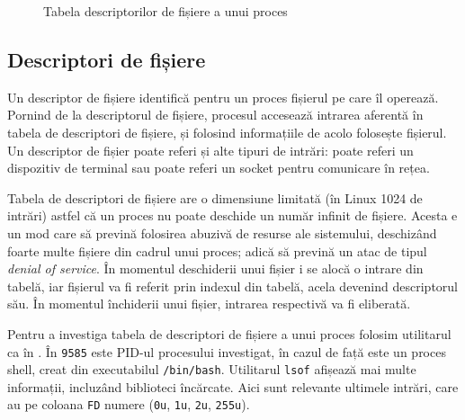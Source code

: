 \begin{figure}[!htbp]
  \centering
  \def\svgwidth{0.8\textwidth}
  
  \caption{Tabela descriptorilor de fișiere a unui proces}
  \label{fig:process:fdtab}
\end{figure}

\subsection{Descriptori de fișiere}
\label{sec:process:fd}

Un descriptor de fișiere identifică pentru un proces fișierul pe care îl operează.
Pornind de la descriptorul de fișiere, procesul accesează intrarea aferentă în tabela de descriptori de fișiere, și folosind informațiile de acolo folosește fișierul.
Un descriptor de fișier poate referi și alte tipuri de intrări: poate referi un dispozitiv de terminal sau poate referi un socket pentru comunicare în rețea.

Tabela de descriptori de fișiere are o dimensiune limitată (în Linux 1024 de intrări) astfel că un proces nu poate deschide un număr infinit de fișiere.
Acesta e un mod care să prevină folosirea abuzivă de resurse ale sistemului, deschizând foarte multe fișiere din cadrul unui proces;
adică să prevină un atac de tipul \textit{denial of service}.
În momentul deschiderii unui fișier i se alocă o intrare din tabelă, iar fișierul va fi referit prin indexul din tabelă, acela devenind descriptorul său.
În momentul închiderii unui fișier, intrarea respectivă va fi eliberată.

Pentru a investiga tabela de descriptori de fișiere a unui proces folosim utilitarul  ca în .
În  \texttt{9585} este PID-ul procesului investigat, în cazul de față este un proces shell, creat din executabilul \texttt{/bin/bash}.
Utilitarul \texttt{lsof} afișează mai multe informații, incluzând biblioteci încărcate.
Aici sunt relevante ultimele intrări, care au pe coloana \texttt{FD} numere (\texttt{0u}, \texttt{1u}, \texttt{2u}, \texttt{255u}).

